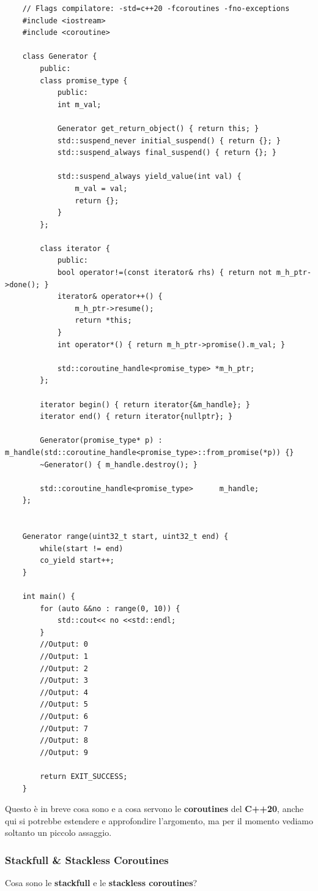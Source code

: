 \begin{lstlisting}
	// Flags compilatore: -std=c++20 -fcoroutines -fno-exceptions
	#include <iostream>
	#include <coroutine>
	
	class Generator {
		public:
		class promise_type {
			public:
			int m_val;
			
			Generator get_return_object() { return this; }
			std::suspend_never initial_suspend() { return {}; }
			std::suspend_always final_suspend() { return {}; }
			
			std::suspend_always yield_value(int val) {
				m_val = val; 
				return {};
			}
		};
		
		class iterator {
			public:
			bool operator!=(const iterator& rhs) { return not m_h_ptr->done(); }
			iterator& operator++() { 
				m_h_ptr->resume(); 
				return *this; 
			}
			int operator*() { return m_h_ptr->promise().m_val; }
			
			std::coroutine_handle<promise_type> *m_h_ptr;
		};
		
		iterator begin() { return iterator{&m_handle}; }
		iterator end() { return iterator{nullptr}; }
		
		Generator(promise_type* p) : m_handle(std::coroutine_handle<promise_type>::from_promise(*p)) {}
		~Generator() { m_handle.destroy(); }
		
		std::coroutine_handle<promise_type>      m_handle;
	};
	
	
	Generator range(uint32_t start, uint32_t end) {
		while(start != end)
		co_yield start++;
	}
	
	int main() {
		for (auto &&no : range(0, 10)) { 
			std::cout<< no <<std::endl;
		}
		//Output: 0
		//Output: 1
		//Output: 2
		//Output: 3
		//Output: 4
		//Output: 5
		//Output: 6
		//Output: 7
		//Output: 8
		//Output: 9
		
		return EXIT_SUCCESS;
	}
\end{lstlisting}

\textsf{\small Questo è in breve cosa sono e a cosa servono le \textbf{coroutines} del \textbf{C++20}, anche qui si potrebbe estendere e approfondire l'argomento, ma per il momento vediamo soltanto un piccolo assaggio. } \\

\subsubsection{Stackfull \& Stackless Coroutines}

\textsf{\small Cosa sono le \textbf{stackfull} e le \textbf{stackless coroutines}?} \\

